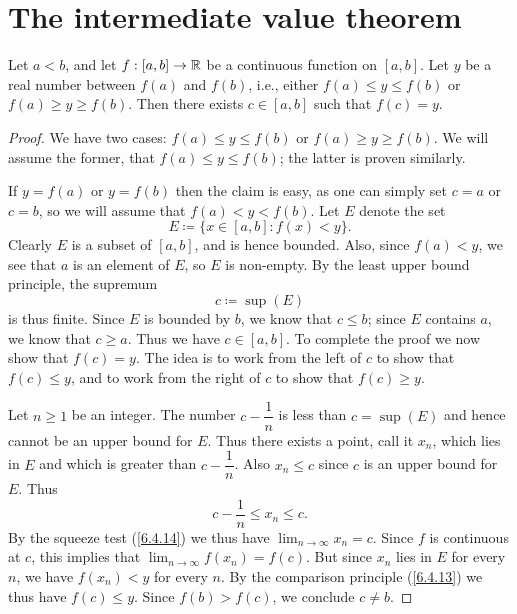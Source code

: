 \section{The intermediate value theorem}\label{sec:9.7}

\begin{thm}\label{9.7.1}
  Let \(a < b\), and let \(f : [a, b] \to \mathbb{R}\) be a continuous function on \([a, b]\).
  Let \(y\) be a real number between \(f(a)\) and \(f(b)\), i.e., either \(f(a) \leq y \leq f(b)\) or \(f(a) \geq y \geq f(b)\).
  Then there exists \(c \in [a, b]\) such that \(f(c) = y\).
\end{thm}

\begin{proof}
  We have two cases: \(f(a) \leq y \leq f(b)\) or \(f(a) \geq y \geq f(b)\).
  We will assume the former, that \(f(a) \leq y \leq f(b)\);
  the latter is proven similarly.

  If \(y = f(a)\) or \(y = f(b)\) then the claim is easy, as one can simply set \(c = a\) or \(c = b\), so we will assume that \(f(a) < y < f(b)\).
  Let \(E\) denote the set
  \[
    E \coloneqq \{x \in [a, b] : f(x) < y\}.
  \]
  Clearly \(E\) is a subset of \([a, b]\), and is hence bounded.
  Also, since \(f(a) < y\), we see that \(a\) is an element of \(E\), so \(E\) is non-empty.
  By the least upper bound principle, the supremum
  \[
    c \coloneqq \sup(E)
  \]
  is thus finite.
  Since \(E\) is bounded by \(b\), we know that \(c \leq b\);
  since \(E\) contains \(a\), we know that \(c \geq a\).
  Thus we have \(c \in [a, b]\).
  To complete the proof we now show that \(f(c) = y\).
  The idea is to work from the left of \(c\) to show that \(f(c) \leq y\), and to work from the right of \(c\) to show that \(f(c) \geq y\).

  Let \(n \geq 1\) be an integer.
  The number \(c - \dfrac{1}{n}\) is less than \(c = \sup(E)\) and hence cannot be an upper bound for \(E\).
  Thus there exists a point, call it \(x_n\), which lies in \(E\) and which is greater than \(c - \dfrac{1}{n}\).
  Also \(x_n \leq c\) since \(c\) is an upper bound for \(E\).
  Thus
  \[
    c - \dfrac{1}{n} \leq x_n \leq c.
  \]
  By the squeeze test (\cref{6.4.14}) we thus have \(\lim_{n \to \infty} x_n = c\).
  Since \(f\) is continuous at \(c\), this implies that \(\lim_{n \to \infty} f(x_n) = f(c)\).
  But since \(x_n\) lies in \(E\) for every \(n\), we have \(f(x_n) < y\) for every \(n\).
  By the comparison principle (\cref{6.4.13}) we thus have \(f(c) \leq y\).
  Since \(f(b) > f(c)\), we conclude \(c \neq b\).


\end{proof}
